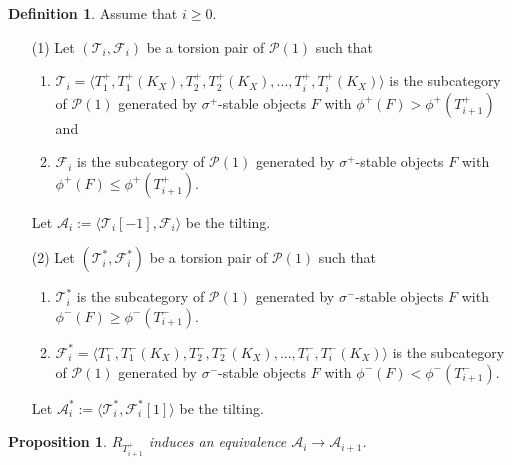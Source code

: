 \documentclass[leqno,11pt]{amsart}
\newtheorem{Prop}[Thm]{Proposition}
\theoremstyle{definition}
\newtheorem{Def}[Thm]{Definition}
\def\AA{\ensuremath{\mathcal A}}
\def\FF{\ensuremath{\mathcal F}}
\def\PP{\ensuremath{\mathcal P}}
\def\TT{\ensuremath{\mathcal T}}
\begin{document}
\begin{Def}
Assume that $i  \geq 0$.
\begin{enumerate}
\item[(1)]
Let $(\TT_i,\FF_i)$ be a torsion pair of $\PP(1)$ such that
\begin{enumerate}
\item
$\TT_i=\langle T_1^+,T_1^+(K_X),T_2^+,T_2^+ (K_X),...,T_i^+,T_i^+ (K_X) \rangle$ 
is the subcategory of $\PP(1)$ generated by $\sigma^+$-stable objects
$F$ with $\phi^+(F)>\phi^+(T_{i+1}^+)$ and
\item
$\FF_i$ is the subcategory of $\PP(1)$ generated by $\sigma^+$-stable objects $F$
with $\phi^+(F) \leq \phi^+(T_{i+1}^+)$.
\end{enumerate}
Let $\AA_i:=\langle \TT_i[-1],\FF_i \rangle$ be the tilting.
\item[(2)]
Let $(\TT_i^*,\FF_i^*)$ be a torsion pair of $\PP(1)$ such that
\begin{enumerate}
\item
$\TT_i^*$ is the subcategory of $\PP(1)$ generated by $\sigma^-$-stable objects $F$
with $\phi^-(F) \geq \phi^-(T_{i+1}^-)$.
\item
$\FF_i^*=\langle T_1^-,T_1^-(K_X),T_2^-,T_2^-(K_X),...,T_i^-,T_i^-(K_X) \rangle$ 
is the subcategory of $\PP(1)$ generated by $\sigma^-$-stable objects
$F$ with $\phi^-(F)<\phi^-(T_{i+1}^-)$.
\end{enumerate}
Let $\AA_i^*:=\langle \TT_i^*,\FF_i^*[1] \rangle$ be the tilting.
\end{enumerate}
\end{Def}











\begin{Prop}\label{Prop:equiv1}
$R_{T_{i+1}^+}$ induces an equivalence
$\AA_i \to \AA_{i+1}$.
\end{Prop}
\end{document}
